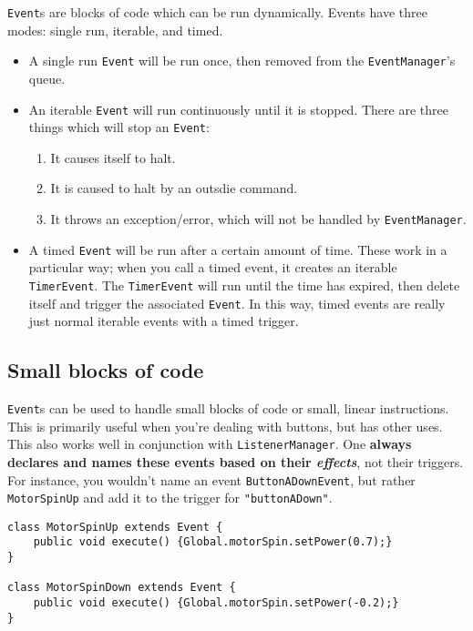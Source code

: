 \documentclass[a4paper]{article}
\begin{document}
\lstinline{Event}s are blocks of code which can be run dynamically. Events have three modes: single run, iterable, and timed. 
\begin{itemize}
	\item{A single run \lstinline{Event} will be run once, then removed from the \lstinline{EventManager}'s queue.}
	\item{An iterable \lstinline{Event} will run continuously until it is stopped. There are three things which will stop an \lstinline{Event}: \begin{enumerate}
		\item{It causes itself to halt.}
		\item{It is caused to halt by an outsdie command.}
		\item{It throws an exception/error, which will not be handled by \lstinline{EventManager}.}
		\end{enumerate}
	}
	\item{A timed \lstinline{Event} will be run after a certain amount of time. These work in a particular way; when you call a timed event, it creates an iterable \lstinline{TimerEvent}. The \lstinline{TimerEvent} will run until the time has expired, then delete itself and trigger the associated \lstinline{Event}. In this way, timed events are really just normal iterable events with a timed trigger.}
\end{itemize}

\subsection{Small blocks of code}

\lstinline{Event}s can be used to handle small blocks of code or small, linear instructions. This is primarily useful when you're dealing with buttons, but has other uses. This also works well in conjunction with \lstinline{ListenerManager}. One \textbf{always declares and names these events based on their \textit{effects}}, not their triggers. For instance, you wouldn't name an event \lstinline{ButtonADownEvent}, but rather \lstinline{MotorSpinUp} and add it to the trigger for \lstinline{"buttonADown"}. 

\begin{lstlisting}
class MotorSpinUp extends Event {
	public void execute() {Global.motorSpin.setPower(0.7);}
}

class MotorSpinDown extends Event {
	public void execute() {Global.motorSpin.setPower(-0.2);}
}
\end{lstlisting}
\end{document}
